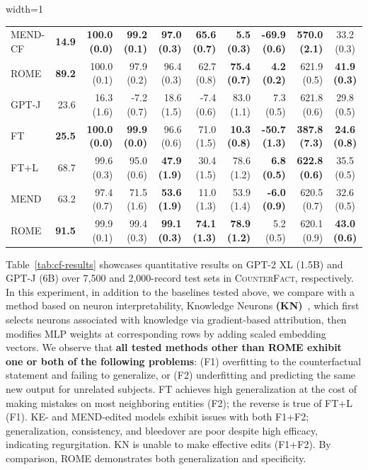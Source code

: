 \documentclass{article}
\newcommand{\badmetric}[1]{{\color{rred} \textbf{#1}}}
\newcommand{\goodmetric}[1]{{\color{ggreen} \textbf{#1}}}
\newcommand{\cfd}{\textsc{CounterFact}\xspace}
\newcommand{\method}{ROME\xspace}
\begin{document}
\begin{table}[!t]
\begin{adjustbox}{width=1\textwidth}
\begin{tabular}{lrrrrrrrrc}
MEND-CF & \badmetric{14.9} & \goodmetric{100.0 (0.0)} & \goodmetric{99.2 (0.1)} & \goodmetric{97.0 (0.3)} & \goodmetric{65.6 (0.7)} & \badmetric{5.5 (0.3)} & \badmetric{-69.9 (0.6)} & \badmetric{570.0 (2.1)} & 33.2 (0.3)\\
ROME & \goodmetric{89.2} & 100.0 (0.1) & 97.9 (0.2) & 96.4 (0.3) & 62.7 (0.8) & \goodmetric{75.4 (0.7)} & \goodmetric{4.2 (0.2)} & 621.9 (0.5) & \goodmetric{41.9 (0.3)}\\
\midrule\midrule
GPT-J & 23.6 & 16.3 (1.6) & -7.2 (0.7) & 18.6 (1.5) & -7.4 (0.6) & 83.0 (1.1) & 7.3 (0.5) & 621.8 (0.6) & 29.8 (0.5)\\\midrule
FT & \badmetric{25.5} & \goodmetric{100.0 (0.0)} & \goodmetric{99.9 (0.0)} & 96.6 (0.6) & 71.0 (1.5) & \badmetric{10.3 (0.8)} & \badmetric{-50.7 (1.3)} & \badmetric{387.8 (7.3)} & \badmetric{24.6 (0.8)}\\
FT+L & 68.7 & 99.6 (0.3) & 95.0 (0.6) & \badmetric{47.9 (1.9)} & 30.4 (1.5) & 78.6 (1.2) & \goodmetric{6.8 (0.5)} & \goodmetric{622.8 (0.6)} & 35.5 (0.5)\\
MEND & 63.2 & 97.4 (0.7) & 71.5 (1.6) & \badmetric{53.6 (1.9)} & 11.0 (1.3) & 53.9 (1.4) & \badmetric{-6.0 (0.9)} & 620.5 (0.7) & 32.6 (0.5)\\
ROME & \goodmetric{91.5} & 99.9 (0.1) & 99.4 (0.3) & \goodmetric{99.1 (0.3)} & \goodmetric{74.1 (1.3)} & \goodmetric{78.9 (1.2)} & 5.2 (0.5) & 620.1 (0.9) & \goodmetric{43.0 (0.6)}\\
    \bottomrule
    \end{tabular}
    \end{adjustbox}
\end{table}%

\addtolength{\tabcolsep}{-2pt}

Table~\ref{tab:cf-results} showcases quantitative results on GPT-2 XL (1.5B) and GPT-J (6B) over 7,500 and 2,000-record test sets in \cfd, respectively.  In this experiment, in addition to the baselines tested above, we compare with a method based on neuron interpretability, Knowledge Neurons \textbf{(KN)}~\citep{dai-kn}, which first selects neurons associated with knowledge via gradient-based attribution, then modifies MLP weights %
at corresponding rows by adding scaled embedding vectors.  We observe that \textbf{all tested methods other than \method exhibit one or both of the following problems}: (F1) overfitting to the counterfactual statement and failing to generalize, or (F2) underfitting and predicting the same new output for unrelated subjects. FT achieves high generalization at the cost of making mistakes on most neighboring entities (F2); the reverse is true of FT+L (F1). KE- and \mbox{MEND-edited} models exhibit issues with both F1+F2; generalization, consistency, and bleedover are poor despite high efficacy, indicating regurgitation. KN is unable to make effective edits (F1+F2). By comparison, \method demonstrates both generalization and specificity.
\end{document}
